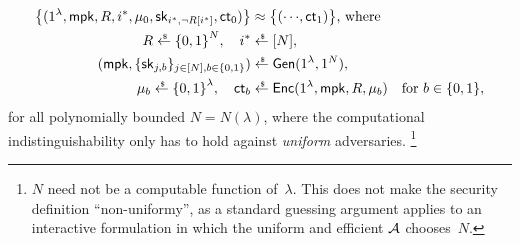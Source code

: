 \begin{definition}
\begin{align*}
\bigl\{(1^\lambda,\mpk,R,i^\ast,\mu_0,\sk_{i^\ast,\neg R[i^\ast]},\ct_0)\bigr\}
&{}\approx
\bigl\{({\cdots},\ct_1)\bigr\}
\textup{, where}\\
R\draws\bit^N,\quad
i^\ast&{}\draws[N],\\
(\mpk,\{\sk_{j,b}\}_{j\in[N],b\in\bit})
&{}\draws\Gen(1^\lambda,1^N),\\
\mu_b\draws\bit^\lambda,\quad
\ct_b&{}\draws\Enc(1^\lambda,\mpk,R,\mu_b)
\quad\textup{for }b\in\bit,
\end{align*}
for all polynomially bounded ${N=N(\lambda)}$,
where the computational indistinguishability only has to hold against \emph{uniform} adversaries.%
\footnote{$N$ need not be a computable function of~$\lambda$.
This does not make the security definition ``non-uniformy'',
as a standard guessing argument applies to an interactive formulation
in which the uniform and efficient ${\mathcal{A}}$ chooses~$N$.}
\end{definition}
